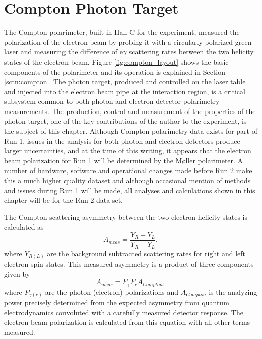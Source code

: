 
\chapter{Compton Photon Target}
\captionsetup{justification=justified,singlelinecheck=false}

\label{Ch:Compton_Laser}

The Compton polarimeter, built in Hall C for the \Qs experiment, measured the polarization of the electron beam by probing it with a circularly-polarized green laser and measuring the difference of e$\gamma$ scattering rates between the two helicity states of the electron beam. Figure \ref{fig:compton_layout} shows the basic components of the polarimeter and its operation is explained in Section \ref{sctn:compton}. The photon target, produced and controlled on the laser table and injected into the electron beam pipe at the interaction region, is a critical subsystem common to both photon and electron detector polarimetry measurements. The production, control and measurement of the properties of the photon target, one of the key contributions of the author to the \Qs experiment, is the subject of this chapter. Although Compton polarimetry data exists for part of Run 1, issues in the analysis for both photon and electron detectors produce larger uncertainties, and at the time of this writing, it appears that the electron beam polarization for Run 1 will be determined by the M\o ller polarimeter. A number of hardware, software and operational changes made before Run 2 make this a much higher quality dataset and although occasional mention of methods and issues during Run 1 will be made, all analyses and calculations shown in this chapter will be for the Run 2 data set.

The Compton scattering asymmetry between the two electron helicity states is calculated as 
\begin{equation}
A_{meas}=\frac{Y_R-Y_L}{Y_R+Y_L},
\label{eq:ameas}
\end{equation}
where $Y_{R(L)}$ are the background subtracted scattering rates for right and left electron spin states. This measured asymmetry is a product of three components given by
\begin{equation}
A_{meas}=P_{\gamma}P_eA_{Compton},
\label{eq:asymtopol}
\end{equation}
where $P_{\gamma (e)}$ are the photon (electron) polarizations and $A_{Compton}$ is the analyzing power precisely determined from the expected asymmetry from quantum electrodynamics convoluted with a carefully measured detector response. The electron beam polarization is calculated from this equation with all other terms measured.

